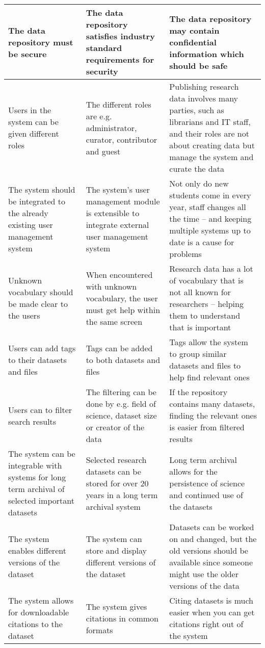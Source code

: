 \begin{tabularx}{\textwidth}{| >{\raggedright}p{3cm} | >{\raggedright}p{3cm} | X |}
    \hline
    \rowcolor{Gray}
    The data repository must be secure   &The data repository satisfies industry standard requirements for security& The data repository may contain confidential information which should be safe\\
    \hline
    Users in the system can be given different roles &The different roles are e.g. administrator, curator, contributor and guest & Publishing research data involves many parties, such as librarians and IT staff, and their roles are not about creating data but manage the system and curate the data\\
    \hline
    \rowcolor{Gray}
    The system should be integrated to the already existing user management system   &The system’s user management module is extensible to integrate external user management system & Not only do new students come in every year, staff changes all the time – and keeping multiple systems up to date is a cause for problems\\
    \hline
    Unknown vocabulary should be made clear to the users  &When encountered with unknown vocabulary, the user must get help within the same screen  & Research data has a lot of vocabulary that is not all known for researchers – helping them to understand that is important\\
    \hline
    \rowcolor{Gray}
    Users can add tags to their datasets and files        &Tags can be added to both datasets and files & Tags allow the system to group similar datasets and files to help find relevant ones\\
    \hline
    Users can to filter search results & The filtering can be done by e.g. field of science, dataset size or creator of the data& If the repository contains many datasets, finding the relevant ones is easier from filtered results\\
    \hline
    \rowcolor{Gray}
    The system can be integrable with systems for long term archival of selected important datasets  &Selected research datasets can be stored for over 20 years in a long term archival system& Long term archival allows for the persistence of science and continued use of the datasets\\
    \hline
    The system enables different versions of the dataset &The system can store and display different versions of the dataset & Datasets can be worked on and changed, but the old versions should be available since someone might use the older versions of the data\\
    \hline
    \rowcolor{Gray}
    The system allows for downloadable citations to the dataset   &The system gives citations in common formats & Citing datasets is much easier when you can get citations right out of the system\\
    \hline
\end{tabularx}

